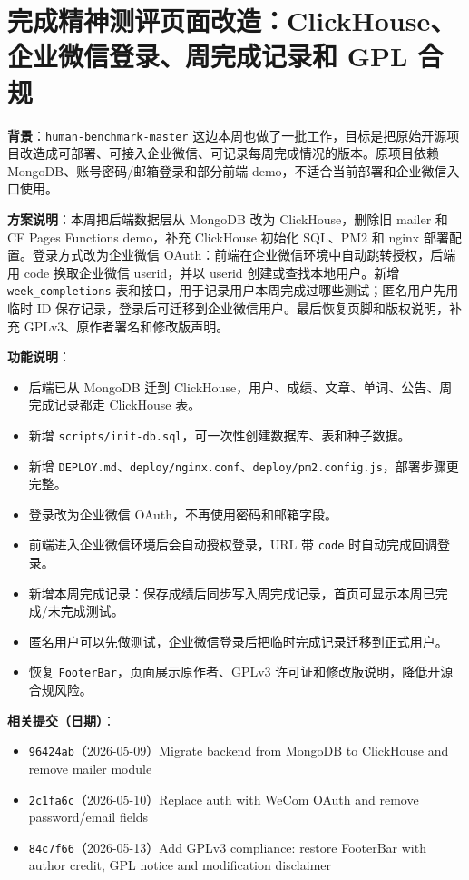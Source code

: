 \documentclass[UTF8]{ctexart}
\begin{document}
\section{完成精神测评页面改造：ClickHouse、企业微信登录、周完成记录和 GPL 合规}

\textbf{背景}：\texttt{human-benchmark-master} 这边本周也做了一批工作，目标是把原始开源项目改造成可部署、可接入企业微信、可记录每周完成情况的版本。原项目依赖 MongoDB、账号密码/邮箱登录和部分前端 demo，不适合当前部署和企业微信入口使用。

\textbf{方案说明}：本周把后端数据层从 MongoDB 改为 ClickHouse，删除旧 mailer 和 CF Pages Functions demo，补充 ClickHouse 初始化 SQL、PM2 和 nginx 部署配置。登录方式改为企业微信 OAuth：前端在企业微信环境中自动跳转授权，后端用 code 换取企业微信 userid，并以 userid 创建或查找本地用户。新增 \texttt{week\_completions} 表和接口，用于记录用户本周完成过哪些测试；匿名用户先用临时 ID 保存记录，登录后可迁移到企业微信用户。最后恢复页脚和版权说明，补充 GPLv3、原作者署名和修改版声明。

\textbf{功能说明}：
\begin{itemize}
\item 后端已从 MongoDB 迁到 ClickHouse，用户、成绩、文章、单词、公告、周完成记录都走 ClickHouse 表。
\item 新增 \texttt{scripts/init-db.sql}，可一次性创建数据库、表和种子数据。
\item 新增 \texttt{DEPLOY.md}、\texttt{deploy/nginx.conf}、\texttt{deploy/pm2.config.js}，部署步骤更完整。
\item 登录改为企业微信 OAuth，不再使用密码和邮箱字段。
\item 前端进入企业微信环境后会自动授权登录，URL 带 \texttt{code} 时自动完成回调登录。
\item 新增本周完成记录：保存成绩后同步写入周完成记录，首页可显示本周已完成/未完成测试。
\item 匿名用户可以先做测试，企业微信登录后把临时完成记录迁移到正式用户。
\item 恢复 \texttt{FooterBar}，页面展示原作者、GPLv3 许可证和修改版说明，降低开源合规风险。
\end{itemize}

\textbf{相关提交（日期）}：
\begin{itemize}
\item \texttt{96424ab}（2026-05-09）Migrate backend from MongoDB to ClickHouse and remove mailer module
\item \texttt{2c1fa6c}（2026-05-10）Replace auth with WeCom OAuth and remove password/email fields
\item \texttt{84c7f66}（2026-05-13）Add GPLv3 compliance: restore FooterBar with author credit, GPL notice and modification disclaimer
\end{itemize}
\end{document}
